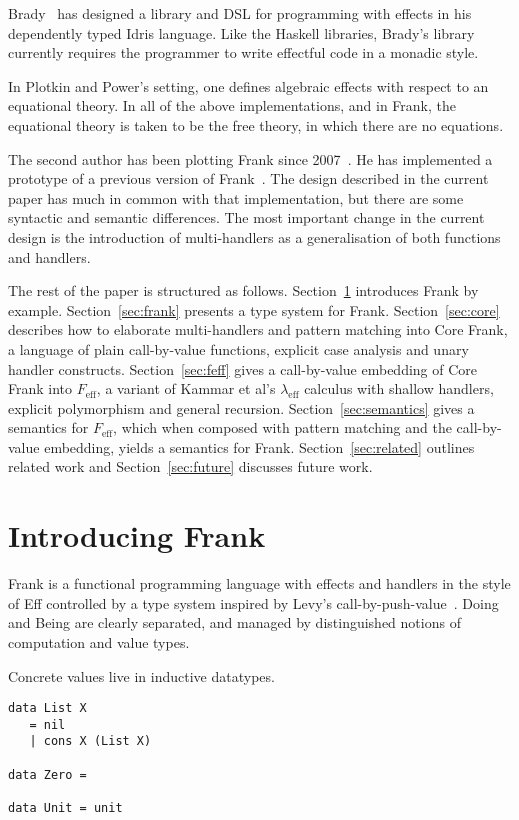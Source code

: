 \documentclass[preprint]{sigplanconf}
\newcommand{\lameff}{$\lambda_\mathrm{eff}$\xspace}
\newcommand{\feff}{$F_\textrm{eff}$\xspace}
\begin{document}
Brady~\cite{Brady13} has designed a library and DSL for programming
with effects in his dependently typed Idris language. Like the Haskell
libraries, Brady's library currently requires the programmer to write
effectful code in a monadic style.

In Plotkin and Power’s setting, one defines algebraic effects with
respect to an equational theory. In all of the above implementations,
and in Frank, the equational theory is taken to be the free theory, in
which there are no equations.
%

The second author has been plotting Frank since
2007~\cite{McBride07}. He has implemented a prototype of a previous
version of Frank~\cite{McBride12}. The design described in the current
paper has much in common with that implementation, but there are some
syntactic and semantic differences. The most important change in the
current design is the introduction of multi-handlers as a
generalisation of both functions and handlers.

The rest of the paper is structured as follows.
%
Section~\ref{sec:examples} introduces Frank by
example. Section~\ref{sec:frank} presents a type system for
Frank. Section~\ref{sec:core} describes how to elaborate
multi-handlers and pattern matching into Core Frank, a language of
plain call-by-value functions, explicit case analysis and unary
handler constructs. Section~\ref{sec:feff} gives a call-by-value
embedding of Core Frank into \feff, a variant of Kammar et al's
\lameff calculus with shallow handlers, explicit polymorphism and
general recursion. Section~\ref{sec:semantics} gives a semantics for
\feff, which when composed with pattern matching and the call-by-value
embedding, yields a semantics for Frank. Section~\ref{sec:related}
outlines related work and Section~\ref{sec:future} discusses future
work.

\section{Introducing Frank}
\label{sec:examples}

Frank is a functional programming language with effects and handlers
in the style of Eff controlled by a type system inspired by Levy's
call-by-push-value~\cite{Levy2004}.
%
Doing and Being are clearly separated, and managed by distinguished
notions of computation and value types.

Concrete values live in inductive datatypes.
%
\begin{verbatim}
data List X
   = nil
   | cons X (List X)

data Zero =

data Unit = unit
\end{verbatim}
\end{document}
